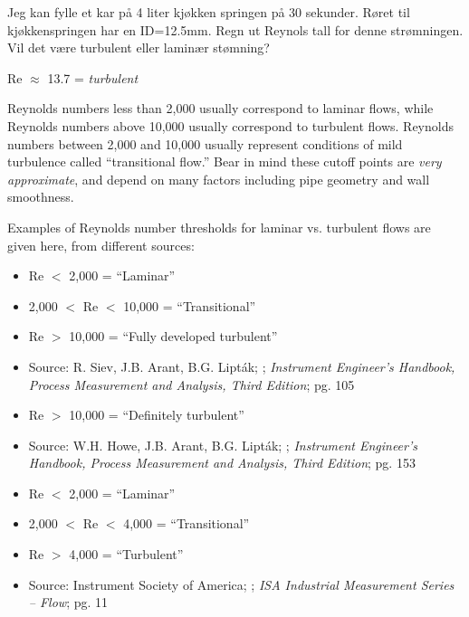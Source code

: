 

Jeg kan fylle et kar på 4 liter kjøkken springen på 30 sekunder. Røret til kjøkkenspringen har en ID=12.5mm. Regn ut Reynols tall for denne strømningen. Vil det være turbulent eller laminær stømning?








Re $\approx$ 13.7 = {\it turbulent}

\vskip 10pt

Reynolds numbers less than 2,000 usually correspond to laminar flows, while Reynolds numbers above 10,000 usually correspond to turbulent flows.  Reynolds numbers between 2,000 and 10,000 usually represent conditions of mild turbulence called ``transitional flow.''  Bear in mind these cutoff points are {\it very approximate}, and depend on many factors including pipe geometry and wall smoothness.

Examples of Reynolds number thresholds for laminar vs. turbulent flows are given here, from different sources:

\begin{itemize}
\goodbreak
\item{} Re $<$ 2,000 = ``Laminar''
\item{} 2,000 $<$ Re $<$ 10,000 = ``Transitional''
\item{} Re $>$ 10,000 = ``Fully developed turbulent''
\item{} Source: R. Siev, J.B. Arant, B.G. Lipt\'ak; ; {\it Instrument Engineer's Handbook, Process Measurement and Analysis, Third Edition}; pg. 105
\end{itemize}

\begin{itemize}
\goodbreak
\item{} Re $>$ 10,000 = ``Definitely turbulent''
\item{} Source: W.H. Howe, J.B. Arant, B.G. Lipt\'ak; ; {\it Instrument Engineer's Handbook, Process Measurement and Analysis, Third Edition}; pg. 153
\end{itemize}

\begin{itemize}
\goodbreak
\item{} Re $<$ 2,000 = ``Laminar''
\item{} 2,000 $<$ Re $<$ 4,000 = ``Transitional''
\item{} Re $>$ 4,000 = ``Turbulent''
\item{} Source: Instrument Society of America; ; {\it ISA Industrial Measurement Series -- Flow}; pg. 11
\end{itemize}

